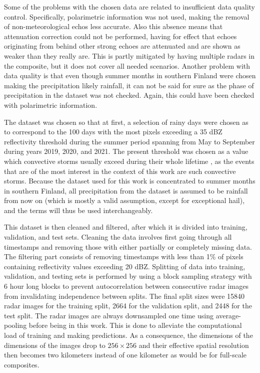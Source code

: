 Some of the problems with the chosen data are related to insufficient data quality control. Specifically, polarimetric information was not used, making the removal of non-meteorological echos less accurate. Also this absence means that attenuation correction could not be performed, having for effect that echoes originating from behind other strong echoes are attenuated and are shown as weaker than they really are. This is partly mitigated by having multiple radars in the composite, but it does not cover all needed scenarios. Another problem with data quality is that even though summer months in southern Finland were chosen making the precipitation likely rainfall, it can not be said for sure as the phase of precipitation in the dataset was not checked. Again, this could have been checked with polarimetric information.



The dataset was chosen so that at first, a selection of rainy days were chosen as to correspond to the 100 days with the most pixels exceeding a 35 dBZ reflectivity threshold during the summer period spanning from May to September during years 2019, 2020, and 2021. The present threshold was chosen as a value which convective storms usually exceed during their whole lifetime \cite{voormansik_thunderstorm_2017}, as the events that are of the most interest in the context of this work are such convective storms. Because the dataset used for this work is concentrated to summer months in southern Finland, all precipitation from the dataset is assumed to be rainfall from now on (which is mostly a valid assumption, except for exceptional hail), and the terms will thus be used interchangeably. 

This dataset is then cleaned and filtered, after which it is divided into training, validation, and test sets. Cleaning the data involves first going through all timestamps and removing those with either partially or completely missing data. The filtering part consists of removing timestamps with less than 1\% of pixels containing reflectivity values exceeding 20 dBZ. Splitting of data into training, validation, and testing sets is performed by using a block sampling strategy \cite{schultz_can_2021} with 6 hour long blocks to prevent autocorrelation between consecutive radar images from invalidating independence between splits. The final split sizes were 15840 radar images for the training split, 2664 for the validation split, and 2448 for the test split. The radar images are always downsampled one time using average-pooling before being in this work. This is done to alleviate the computational load of training and making predictions. As a consequence, the dimensions of the dimensions of the images drop to $256 \times 256$ and their effective spatial resolution then becomes two kilometers instead of one kilometer as would be for full-scale composites. 

